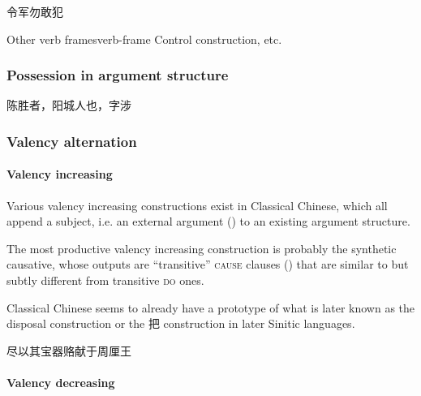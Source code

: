 \documentclass[UTF8, a4paper, oneside, scheme=plain, 12pt]{ctexrep}
\newcommand*{\category}[1]{\textsc{#1}}
\begin{document}
\begin{exe}
    \ex\label{ex:grammatical.clause.argument.verbal-complementation.raising.1} 令军勿敢犯
\end{exe}

\begin{todobox}{Other verb frames}{verb-frame}
    Control construction, etc.
\end{todobox}

\subsubsection{Possession in argument structure}

\begin{exe}
    \ex 陈胜者，阳城人也，字涉
\end{exe}

\subsubsection{Valency alternation}

\paragraph{Valency increasing}\label{sec:grammatical.clause.argument.alternation.increase}

Various valency increasing constructions exist in Classical Chinese,
which all append a subject, i.e. an external argument () to an existing argument structure.

The most productive valency increasing construction is probably the synthetic causative,
whose outputs are ``transitive'' \category{cause} clauses
()
that are similar to but subtly different from transitive \category{do} ones.

Classical Chinese seems to already have a prototype of what is later known as the disposal construction or the 把 construction in later Sinitic languages.

\begin{exe}
    \ex 尽以其宝器赂献于周厘王
\end{exe}

\paragraph{Valency decreasing}
\end{document}
